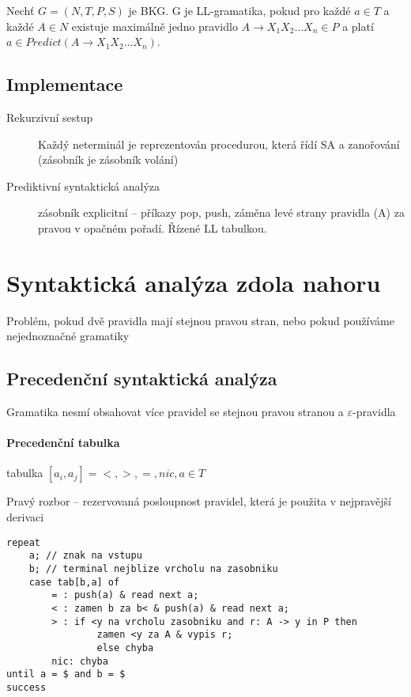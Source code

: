 \documentclass[a4paper, 11pt]{report}
\begin{document}
Nechť $G = (N, T, P, S)$ je BKG. G je LL-gramatika, pokud pro každé $a \in T$ a každé $A \in N$ existuje maximálně jedno pravidlo $A \to X_1 X_2 \dots X_n \in P$ a platí $a \in Predict(A \to X_1 X_2 \dots X_n)$.

\subsection{Implementace}
\begin{description}
	\item[Rekurzivní sestup] Každý neterminál je reprezentován procedurou, která řídí SA a zanořování (zásobník je zásobník volání)
	\item[Prediktivní syntaktická analýza] zásobník explicitní -- příkazy pop, push, záměna levé strany pravidla (A) za pravou v opačném pořadí. Řízené LL tabulkou.
\end{description}

\section{Syntaktická analýza zdola nahoru}

Problém, pokud dvě pravidla mají stejnou pravou stran, nebo pokud používáme nejednoznačné gramatiky

\subsection{Precedenční syntaktická analýza}

Gramatika nesmí obsahovat více pravidel se stejnou pravou stranou a $\varepsilon$-pravidla

\paragraph{Precedenční tabulka}
tabulka $[ a_i, a_j ] = {<, >, =, nic}, a \in T$

Pravý rozbor -- rezervovaná posloupnost pravidel, která je použita v nejpravější derivaci

\begin{lstlisting}
repeat
	a; // znak na vstupu
	b; // terminal nejblize vrcholu na zasobniku
	case tab[b,a] of
		= : push(a) & read next a;
		< : zamen b za b< & push(a) & read next a;
		> : if <y na vrcholu zasobniku and r: A -> y in P then
				zamen <y za A & vypis r;
				else chyba
		nic: chyba
until a = $ and b = $
success
\end{lstlisting}
\end{document}
